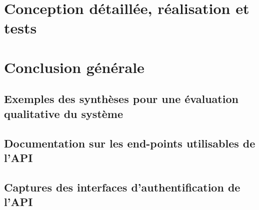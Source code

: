\documentclass[12pt,twoside,openany]{book}
\begin{document}
\chapter{Conception détaillée, réalisation et tests}

\chapter*{Conclusion générale}

\backmatter


\backmatter
\begin{appendices}
\section{Exemples des synthèses pour une évaluation qualitative du système}\label{AnnexesExemples}
\newpage
\section{Documentation sur les end-points utilisables de l'API}\label{AnnexeDocu}
\newpage
\section{Captures des interfaces d'authentification de l'API}\label{AnnexeFrontAPI}

\end{appendices}
\end{document}
